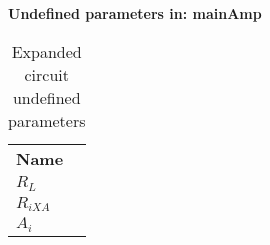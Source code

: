 {\textbf{Undefined parameters in: mainAmp}}

\begin{table}[H]
\centering
\begin{tabular}[c]{l}
\textbf{Name} \\ 
\rowcolor{myyellow}
$R_{L}$ \\ 
$R_{i XA}$ \\ 
\rowcolor{myyellow}
$A_{i}$ \\ 
\end{tabular}
\caption{Expanded circuit undefined parameters}
\end{table}

